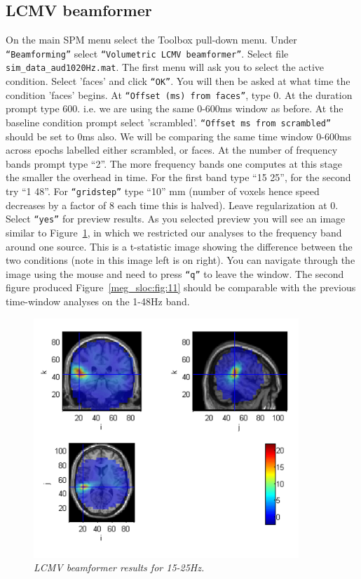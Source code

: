 \subsection{LCMV beamformer}
On the main SPM menu select the Toolbox pull-down menu. Under \texttt{``Beamforming''} select \texttt{``Volumetric LCMV beamformer''}.
Select file \texttt{sim\_data_aud1020Hz.mat}.
The first menu will ask you to select the active condition. Select 'faces' and click \texttt{``OK''}. You will then be asked at what time the condition 'faces' begins.  At \texttt{``Offset (ms) from faces''}, type 0. At the duration prompt type 600. i.e. we are using the same 0-600ms window as before. At the baseline condition prompt select 'scrambled'. \texttt{``Offset ms from scrambled''} should be set to 0ms also. We will be comparing the same time window 0-600ms across epochs labelled either scrambled, or faces. At the number of frequency bands prompt type ``2''. The more frequency bands one computes at this stage the smaller the overhead in time. For the first band type ``15 25'', for the second try ``1 48''. For \texttt{``gridstep''} type ``10'' mm (number of voxels hence speed decreases by a factor of 8 each time this is halved). Leave regularization at 0. Select \texttt{``yes''} for preview results.
As you selected preview you will see an image similar to Figure~\ref{meg_sloc:fig:10}, in which we restricted our analyses to the frequency band around one source. This is a t-statistic image showing the difference between the two conditions (note in this image left is on right). You can navigate through the image using the mouse and need to press  \texttt{``q''} to leave the window. The second figure produced Figure~\ref{meg_sloc:fig:11} should be comparable with the previous time-window analyses on the 1-48Hz band. 

\begin{figure}
\begin{center}
\includegraphics[width=100mm]{meg_sloc/Slide10}
\caption{\em LCMV beamformer results for 15-25Hz.\label{meg_sloc:fig:10}}
\end{center}
\end{figure}

